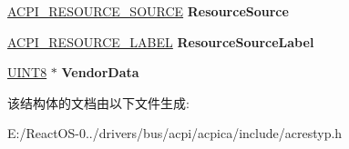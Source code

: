 \begin{DoxyCompactItemize}
\hyperlink{structacpi__resource__source}{A\+C\+P\+I\+\_\+\+R\+E\+S\+O\+U\+R\+C\+E\+\_\+\+S\+O\+U\+R\+CE} {\bfseries Resource\+Source}
\item 
\mbox{\label{structacpi__resource__pin__group__function_a8d9039efaffb976eb2b1e2496a31d9a6}} 
\hyperlink{structacpi__resource__label}{A\+C\+P\+I\+\_\+\+R\+E\+S\+O\+U\+R\+C\+E\+\_\+\+L\+A\+B\+EL} {\bfseries Resource\+Source\+Label}
\item 
\mbox{\label{structacpi__resource__pin__group__function_ad8224d4e47bed576e4e9a69f8e772dc1}} 
\hyperlink{_processor_bind_8h_ab27e9918b538ce9d8ca692479b375b6a}{U\+I\+N\+T8} $\ast$ {\bfseries Vendor\+Data}
\end{DoxyCompactItemize}


该结构体的文档由以下文件生成\+:\begin{DoxyCompactItemize}
\item 
E\+:/\+React\+O\+S-\/0../drivers/bus/acpi/acpica/include/acrestyp.\+h\end{DoxyCompactItemize}
